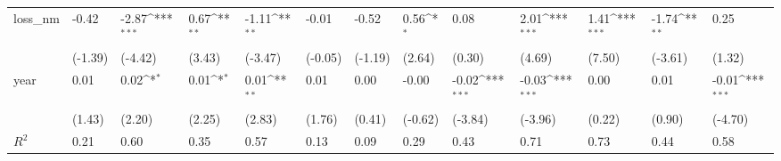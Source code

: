 \def\sym#1{\ifmmode^{#1}\else\(^{#1}\)\fi}
\begin{tabular}{p{1.5cm} p{1.7cm} p{1.7cm} p{1.7cm}  p{1.7cm} p{1.7cm} p{1.7cm} p{1.7cm} p{1.7cm}  p{1.7cm} p{1.7cm} p{1.7cm} p{1.7cm} }
\hline
loss\_nm         &    -0.42         &    -2.87\sym{***}&     0.67\sym{**} &    -1.11\sym{**} &    -0.01         &    -0.52         &     0.56\sym{*}  &     0.08         &     2.01\sym{***}&     1.41\sym{***}&    -1.74\sym{**} &     0.25         \\
                &  (-1.39)         &  (-4.42)         &   (3.43)         &  (-3.47)         &  (-0.05)         &  (-1.19)         &   (2.64)         &   (0.30)         &   (4.69)         &   (7.50)         &  (-3.61)         &   (1.32)         \\
year            &     0.01         &     0.02\sym{*}  &     0.01\sym{*}  &     0.01\sym{**} &     0.01         &     0.00         &    -0.00         &    -0.02\sym{***}&    -0.03\sym{***}&     0.00         &     0.01         &    -0.01\sym{***}\\
                &   (1.43)         &   (2.20)         &   (2.25)         &   (2.83)         &   (1.76)         &   (0.41)         &  (-0.62)         &  (-3.84)         &  (-3.96)         &   (0.22)         &   (0.90)         &  (-4.70)         \\
\hline
\(R^{2}\)       &     0.21         &     0.60         &     0.35         &     0.57         &     0.13         &     0.09         &     0.29         &     0.43         &     0.71         &     0.73         &     0.44         &     0.58         \\
\end{tabular}
\def\sym#1{\ifmmode^{#1}\else\(^{#1}\)\fi}
